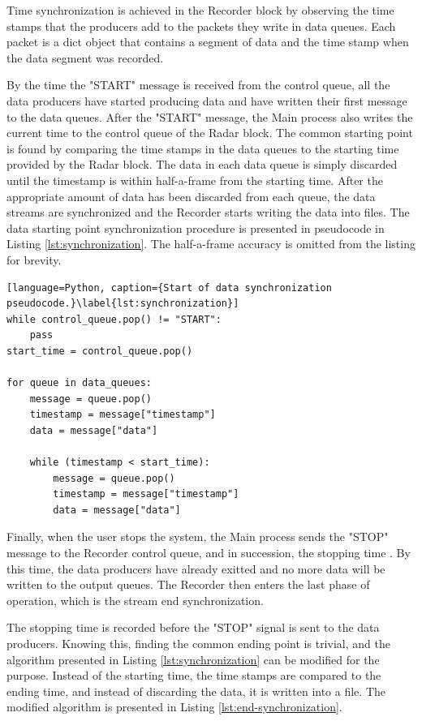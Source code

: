 Time synchronization is achieved in the Recorder block by observing the time stamps that the producers add to the packets they write in data queues.
Each packet is a dict object that contains a segment of data and the time stamp when the data segment was recorded.

By the time the "START" message is received from the control queue,
all the data producers have started producing data and have written their first message to the data queues.
After the "START" message, the Main process also writes the current time to the control queue of the Radar block.
The common starting point is found by comparing the time stamps in the data queues to the starting time provided by the Radar block.
The data in each data queue is simply discarded until the timestamp is within half-a-frame from the starting time.
After the appropriate amount of data has been discarded from each queue,
the data streams are synchronized and the Recorder starts writing the data into files.
The data starting point synchronization procedure is presented in pseudocode in Listing \ref{lst:synchronization}.
The half-a-frame accuracy is omitted from the listing for brevity.

\begin{lstlisting}[language=Python, caption={Start of data synchronization pseudocode.}\label{lst:synchronization}]
while control_queue.pop() != "START":
    pass
start_time = control_queue.pop()

for queue in data_queues:
    message = queue.pop()
    timestamp = message["timestamp"]
    data = message["data"]
    
    while (timestamp < start_time):
        message = queue.pop()
        timestamp = message["timestamp"]
        data = message["data"]
\end{lstlisting}

Finally, when the user stops the system, the Main process sends the "STOP" message to the Recorder control queue,
and in succession, the stopping time .
By this time, the data producers have already exitted and no more data will be written to the output queues.
The Recorder then enters the last phase of operation,
which is the stream end synchronization.

The stopping time is recorded before the "STOP" signal is sent to the data producers.
Knowing this, finding the common ending point is trivial,
and the algorithm presented in Listing \ref{lst:synchronization} can be modified for the purpose.
Instead of the starting time, the time stamps are compared to the ending time,
and instead of discarding the data, it is written into a file.
The modified algorithm is presented in Listing \ref{lst:end-synchronization}.

